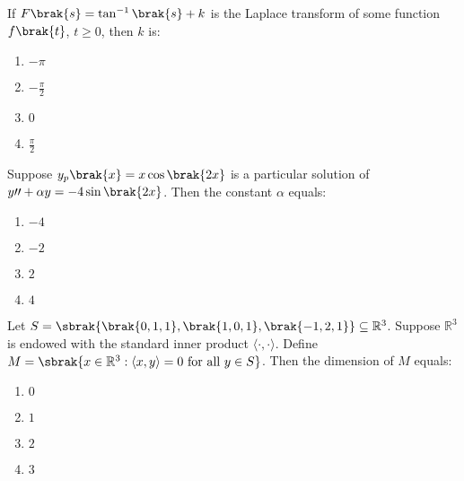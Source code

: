 \iffalse
    \title{Assignment}
    \author{EE24BTECH11034}
    \section{ma}
    \chapter{2007}
  \fi

  \item If $F\brak{s} = \tan^{-1}\brak{s} + k$ is the Laplace transform of some function $f\brak{t}$, $t \geq 0$, then $k$ is:
    
    \begin{multicols}{4}
    \begin{enumerate}
        \item $-\pi$
        \item $-\frac{\pi}{2}$
        \item $0$
        \item $\frac{\pi}{2}$
    \end{enumerate}
    \end{multicols}

  \item Suppose $y_p\brak{x} = x \cos\brak{2x}$ is a particular solution of $y\prime\prime + \alpha y = -4 \sin\brak{2x}$. Then the constant $\alpha$ equals:
    
    \begin{multicols}{4}
    \begin{enumerate}
        \item $-4$
        \item $-2$
        \item $2$
        \item $4$
    \end{enumerate}
    \end{multicols}

  \item Let $S = \sbrak{\brak{0,1,1}, \brak{1,0,1}, \brak{-1,2,1}} \subseteq \mathbb{R}^3$. Suppose $\mathbb{R}^3$ is endowed with the standard inner product $\langle \cdot, \cdot \rangle$. Define $M = \sbrak{x \in \mathbb{R}^3 : \langle x, y \rangle = 0 \text{ for all } y \in S}$. Then the dimension of $M$ equals:

    \begin{multicols}{4}
    \begin{enumerate}
        \item $0$
        \item $1$
        \item $2$
        \item $3$
    \end{enumerate}
    \end{multicols}


